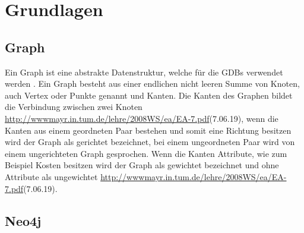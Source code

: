 
\chapter{Grundlagen} %

\label{Kaptiel 2} %

\section{Graph}

Ein Graph ist eine abstrakte Datenstruktur, welche für die GDBs verwendet werden \parencite{vicknair2010comparison}. Ein Graph besteht aus einer endlichen nicht leeren Summe von Knoten, auch Vertex oder Punkte genannt und Kanten. Die Kanten des Graphen bildet die Verbindung zwischen zwei Knoten \url{ http://wwwmayr.in.tum.de/lehre/2008WS/ea/EA-7.pdf}(7.06.19), wenn die Kanten aus einem geordneten Paar bestehen und somit eine Richtung besitzen wird der Graph als gerichtet bezeichnet, bei einem ungeordneten Paar wird von einem ungerichteten Graph gesprochen\parencite{bondy1976graph}. Wenn die Kanten Attribute, wie zum Beispiel Kosten besitzen wird der Graph als gewichtet bezeichnet und ohne Attribute als ungewichtet  \url{ http://wwwmayr.in.tum.de/lehre/2008WS/ea/EA-7.pdf}(7.06.19). 

\section{Neo4j}

